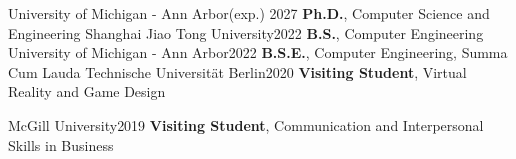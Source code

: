   \SubHeadingListStart
  
    \SubHeading
    {University of Michigan - Ann Arbor}{(exp.) 2027 }
    {\textbf{Ph.D.}, Computer Science and Engineering}{}
        \ItemListStart
        \ItemListEnd
    \SubHeading
    {Shanghai Jiao Tong University}{2022}
    {\textbf{B.S.}, Computer Engineering}{}
    \SubHeading
    {University of Michigan - Ann Arbor}{2022}
    {\textbf{B.S.E.}, Computer Engineering, Summa Cum Lauda}{}
    \ItemListStart
    \ItemListEnd
    \SubHeadingCV
    {Technische Universität Berlin}{2020}
    {\textbf{Visiting Student}, Virtual Reality and Game Design}{}

    \SubHeadingCV
    {McGill University}{2019}
    {\textbf{Visiting Student}, Communication and Interpersonal Skills in Business}{}
        
  \SubHeadingListEnd